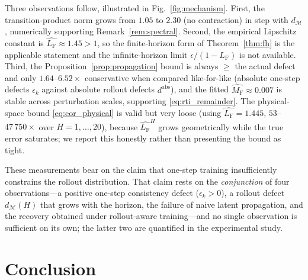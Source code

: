 \documentclass[journal]{IEEEtran}
\newcommand{\mLf}{L_{\mathrm{F}}}
\newcommand{\mMF}{M_{\mathrm{F}}}
\begin{document}
Three observations follow, illustrated in Fig.~\ref{fig:mechanism}. First, the transition-product norm grows from $1.05$ to $2.30$ (no contraction) in step with $d_{\mathcal M}$, numerically supporting Remark~\ref{rem:spectral}. Second, the empirical Lipschitz constant is $\widehat{\mLf}\approx1.45>1$, so the finite-horizon form of Theorem~\ref{thm:fh} is the applicable statement and the infinite-horizon limit $\epsilon/(1-\mLf)$ is not available. Third, the Proposition~\ref{prop:propagation} bound is always $\ge$ the actual defect and only $1.64$--$6.52\times$ conservative when compared like-for-like (absolute one-step defects $\epsilon_k$ against absolute rollout defects $d^{\mathrm{abs}}$), and the fitted $\widehat{\mMF}\approx0.007$ is stable across perturbation scales, supporting \eqref{eq:rti_remainder}. The physical-space bound \eqref{eq:cor_physical} is valid but very loose (using $\widehat{\mLf}=1.445$, $53$--$47\,750\times$ over $H=1,\dots,20$), because $\widehat{\mLf}^{H}$ grows geometrically while the true error saturates; we report this honestly rather than presenting the bound as tight.

These measurements bear on the claim that one-step training insufficiently constrains the rollout distribution. That claim rests on the \emph{conjunction} of four observations---a positive one-step consistency defect ($\epsilon_k>0$), a rollout defect $d_{\mathcal M}(H)$ that grows with the horizon, the failure of naive latent propagation, and the recovery obtained under rollout-aware training---and no single observation is sufficient on its own; the latter two are quantified in the experimental study.




\section{Conclusion}
\label{sec:conclusion}
\end{document}
